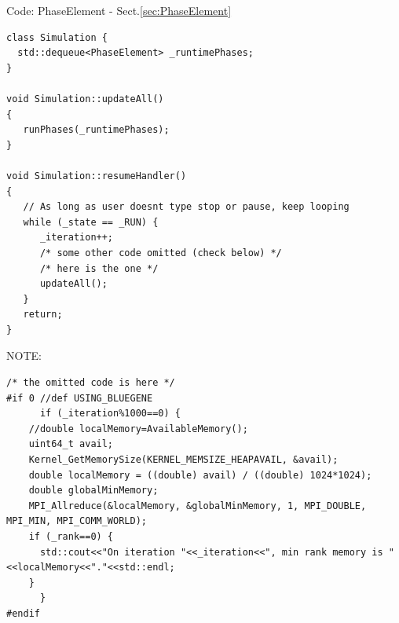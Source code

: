 Code: PhaseElement - Sect.\ref{sec:PhaseElement}
\begin{lstlisting}
class Simulation {
  std::dequeue<PhaseElement> _runtimePhases;
}

void Simulation::updateAll()                                                                                                                                                                           
{                                                                                                             
   runPhases(_runtimePhases);                                                                                                   
}                                               

void Simulation::resumeHandler()                                                                              
{                                                                                                             
   // As long as user doesnt type stop or pause, keep looping                                                 
   while (_state == _RUN) {                                                                                   
      _iteration++;
      /* some other code omitted (check below) */
      /* here is the one */
      updateAll();                                                                                            
   }                                                                                                          
   return;                                                                                                    
}                                      
\end{lstlisting}

NOTE:
{\tiny
\begin{lstlisting}
/* the omitted code is here */
#if 0 //def USING_BLUEGENE                                                                                    
      if (_iteration%1000==0) {                                                                               
    //double localMemory=AvailableMemory();                                                                   
    uint64_t avail;                                                                                           
    Kernel_GetMemorySize(KERNEL_MEMSIZE_HEAPAVAIL, &avail);                                                   
    double localMemory = ((double) avail) / ((double) 1024*1024);                                             
    double globalMinMemory;                                                                                   
    MPI_Allreduce(&localMemory, &globalMinMemory, 1, MPI_DOUBLE, MPI_MIN, MPI_COMM_WORLD);                    
    if (_rank==0) {                                                                                           
      std::cout<<"On iteration "<<_iteration<<", min rank memory is "<<localMemory<<"."<<std::endl;           
    }                                                                                                         
      }                                                                           
#endif                                                                                                        
\end{lstlisting}
}

